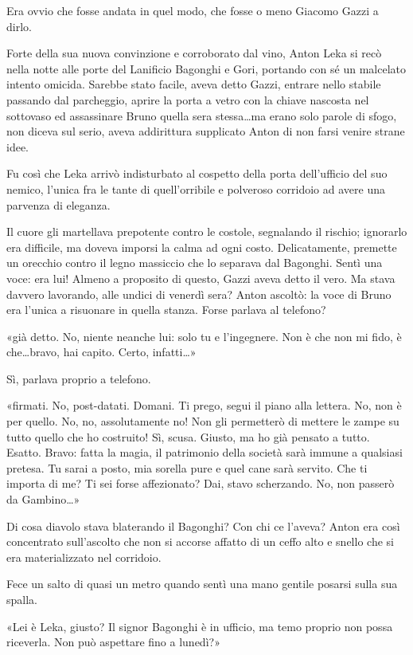 Era ovvio che fosse andata in quel modo, che fosse o meno Giacomo Gazzi a dirlo.

Forte della sua nuova convinzione e corroborato dal vino, Anton Leka si recò nella notte alle porte del Lanificio Bagonghi e Gori, portando con sé un malcelato intento omicida. Sarebbe stato facile, aveva detto Gazzi, entrare nello stabile passando dal parcheggio, aprire la porta a vetro con la chiave nascosta nel sottovaso ed assassinare Bruno quella sera stessa\ldots ma erano solo parole di sfogo, non diceva sul serio, aveva addirittura supplicato Anton di non farsi venire strane idee.

Fu così che Leka arrivò indisturbato al cospetto della porta dell'ufficio del suo nemico, l'unica fra le tante di quell'orribile e polveroso corridoio ad avere una parvenza di eleganza.

Il cuore gli martellava prepotente contro le costole, segnalando il rischio; ignorarlo era difficile, ma doveva imporsi la calma ad ogni costo. Delicatamente, premette un orecchio contro il legno massiccio che lo separava dal Bagonghi. Sentì una voce: era lui! Almeno a proposito di questo, Gazzi aveva detto il vero. Ma stava davvero lavorando, alle undici di venerdì sera? Anton ascoltò: la voce di Bruno era l'unica a risuonare in quella stanza. Forse parlava al telefono?

«\ldotsavevamo già detto. No, niente neanche lui: solo tu e l'ingegnere. Non è che non mi fido, è che\ldots bravo, hai capito. Certo, infatti\ldots»

Sì, parlava proprio a telefono.

« firmati. No, post-datati. Domani. Ti prego, segui il piano alla lettera. No, non è per quello. No, no, assolutamente no! Non gli permetterò di mettere le zampe su tutto quello che ho costruito! Sì, scusa. Giusto, ma ho già pensato a tutto. Esatto. Bravo: fatta la magia, il patrimonio della società sarà immune a qualsiasi pretesa. Tu sarai a posto, mia sorella pure e quel cane sarà servito. Che ti importa di me? Ti sei forse affezionato? Dai, stavo scherzando. No, non passerò da Gambino\ldots»

Di cosa diavolo stava blaterando il Bagonghi? Con chi ce l'aveva? Anton era così concentrato sull'ascolto che non si accorse affatto di un ceffo alto e snello che si era materializzato nel corridoio.

Fece un salto di quasi un metro quando sentì una mano gentile posarsi sulla sua spalla.

«Lei è Leka, giusto? Il signor Bagonghi è in ufficio, ma temo proprio non possa riceverla. Non può aspettare fino a lunedì?»

